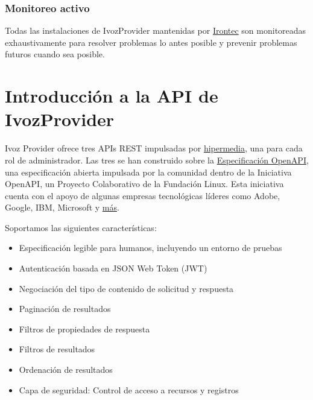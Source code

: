 \documentclass[letterpaper,10pt,spanish]{sphinxmanual}
\begin{document}
\subsection{Monitoreo activo}
\label{security_and_maintenance/maintenance/other_tools:active-monitoring}
Todas las instalaciones de IvozProvider mantenidas por \href{https://www.irontec.com}{Irontec} son monitoreadas exhaustivamente para resolver problemas lo antes posible y prevenir problemas futuros cuando sea posible.


\chapter{Introducción a la API de IvozProvider}
\label{api_rest/introduction:introduction-to-ivozprovider-api}\label{api_rest/introduction::doc}
Ivoz Provider ofrece tres APIs REST impulsadas por \href{https://en.wikipedia.org/wiki/HATEOAS}{hipermedia}, una para cada rol de administrador. Las tres se han construido sobre la \href{https://www.openapis.org/}{Especificación OpenAPI}, una especificación abierta impulsada por la comunidad dentro de la Iniciativa OpenAPI, un Proyecto Colaborativo de la Fundación Linux. Esta iniciativa cuenta con el apoyo de algunas empresas tecnológicas líderes como Adobe, Google, IBM, Microsoft y \href{https://www.openapis.org/membership/members)}{más}.

Soportamos las siguientes características:
\begin{itemize}
\item {} 
Especificación legible para humanos, incluyendo un entorno de pruebas

\item {} 
Autenticación basada en JSON Web Token (JWT)

\item {} 
Negociación del tipo de contenido de solicitud y respuesta

\item {} 
Paginación de resultados

\item {} 
Filtros de propiedades de respuesta

\item {} 
Filtros de resultados

\item {} 
Ordenación de resultados

\item {} 
Capa de seguridad: Control de acceso a recursos y registros

\end{itemize}
\end{document}
